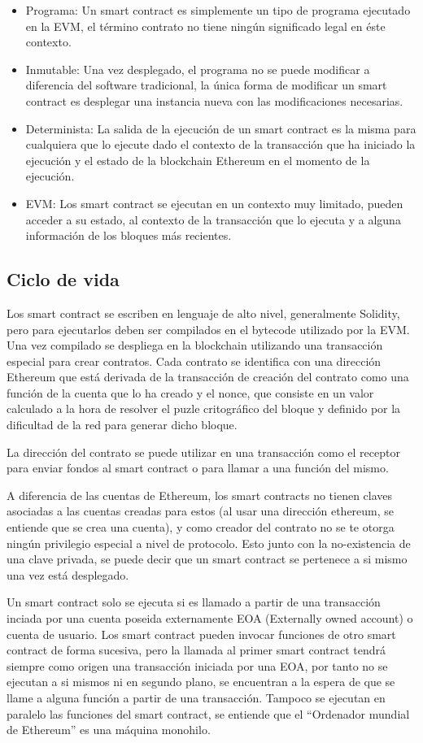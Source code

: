 \documentclass[12pt]{report}
\begin{document}
\begin{itemize}
\item Programa: Un smart contract es simplemente un tipo de programa ejecutado en la EVM, el término contrato no tiene ningún significado legal en éste contexto.
\item Inmutable: Una vez desplegado, el programa no se puede modificar a diferencia del software tradicional, la única forma de modificar un smart contract es desplegar una instancia nueva con las modificaciones necesarias.
\item Determinista: La salida de la ejecución de un smart contract es la misma para cualquiera que lo ejecute dado el contexto de la transacción que ha iniciado la ejecución y el estado de la blockchain Ethereum en el momento de la ejecución.
\item EVM: Los smart contract se ejecutan en un contexto muy limitado, pueden acceder a su estado, al contexto de la transacción que lo ejecuta y a alguna información de los bloques más recientes.
\end{itemize}
\subsection{Ciclo de vida}
Los smart contract se escriben en lenguaje de alto nivel, generalmente Solidity, pero para ejecutarlos deben ser compilados en el bytecode utilizado por la EVM. Una vez compilado se despliega en la blockchain utilizando una transacción especial para crear contratos. Cada contrato se identifica con una dirección Ethereum que está derivada de la transacción de creación del contrato como una función de la cuenta que lo ha creado y el nonce, que consiste en un valor calculado a la hora de resolver el puzle critográfico del bloque y definido por la dificultad de la red para generar dicho bloque.

La dirección del contrato se puede utilizar en una transacción como el receptor para enviar fondos al smart contract o para llamar a una función del mismo.

A diferencia de las cuentas de Ethereum, los smart contracts no tienen claves asociadas a las cuentas creadas para estos (al usar una dirección ethereum, se entiende que se crea una cuenta), y como creador del contrato no se te otorga ningún privilegio especial a nivel de protocolo. Esto junto con la no-existencia de una clave privada, se puede decir que un smart contract se pertenece a si mismo una vez está desplegado.

Un smart contract solo se ejecuta si es llamado a partir de una transacción inciada por una cuenta poseida externamente EOA (Externally owned account) o cuenta de usuario. Los smart contract pueden invocar funciones de otro smart contract de forma sucesiva, pero la llamada al primer smart contract tendrá siempre como origen una transacción iniciada por una EOA, por tanto no se ejecutan a si mismos ni en segundo plano, se encuentran a la espera de que se llame a alguna función a partir de una transacción. Tampoco se ejecutan en paralelo las funciones del smart contract, se entiende que el ``Ordenador mundial de Ethereum'' es una máquina monohilo.
\end{document}

